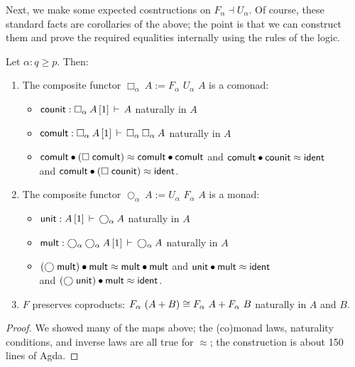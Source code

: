 \documentclass{drl-common/llncs}
\newcommand{\la}{\ensuremath{\dashv}}
\newcommand\F[2]{\ensuremath{F_{#1} \,\, #2}}
\newcommand\U[2]{\ensuremath{U_{#1} \,\, #2}}
\newcommand\coprd[2]{\ensuremath{#1 + #2}}
\newcommand\seq[3]{\ensuremath{#1 \, [ #2 ] \, \vdash \, #3}}
\newcommand\ident[1]{\ensuremath{\dsd{ident}_{#1}}}
\newcommand\cuti{\ensuremath{\bullet}}
\newcommand\ap[2]{\ensuremath{#1 \approx #2}}
\newcommand\Bx[2]{\ensuremath{\Box_{#1} \: {#2}}}
\newcommand\Crc[2]{\ensuremath{\bigcirc_{#1} \: {#2}}}
\begin{document}
Next, we make some expected cosntructions on $F_\alpha \la U_\alpha$.
Of course, these standard facts are corollaries of the above; the point
is that we can construct them and prove the required equalities
internally using the rules of the logic.

\begin{lemma}
Let $\alpha : q \ge p$.  Then:
\begin{enumerate}
\item The composite functor $\Bx{\alpha}{A} := \F{\alpha}{\U{\alpha}{A}}$ is a comonad:
\begin{itemize}
\item[] $\dsd{counit} : \seq{\Bx \alpha A}{1}{A}$ naturally in $A$
\item[] $\dsd{comult} : \seq{\Bx \alpha A}{1}{\Bx \alpha {\Bx \alpha A}}$
  naturally in $A$
\item[] 
 \ap{\dsd{comult} \cuti (\Bx{}{\dsd{comult}})}{\dsd{comult} \cuti
   \dsd{comult}}
and \ap{\dsd{comult} \cuti \dsd{counit}}{\ident{}} \\
and \ap{\dsd{comult} \cuti (\Bx{}{\dsd{counit}})}{\ident{}}.  
\end{itemize}

\item The composite functor $\Crc{\alpha}{A} := \U{\alpha}{\F{\alpha}{A}}$ is a monad:
\begin{itemize}
\item[] $\dsd{unit} : \seq{A}{1}{\Crc \alpha A}$ naturally in $A$
\item[] $\dsd{mult} : \seq{\Crc \alpha {\Crc \alpha A}}{1}{\Crc \alpha A}$
  naturally in $A$
\item[] 
 \ap{(\Crc{}{\dsd{mult}}) \cuti \dsd{mult} }{\dsd{mult} \cuti
   \dsd{mult}}
and \ap{\dsd{unit} \cuti \dsd{mult}}{\ident{}} \\
and \ap{(\Crc{}{\dsd{unit}}) \cuti \dsd{mult}}{\ident{}}.  
\end{itemize}

\item $F$ preserves coproducts: $\F \alpha (\coprd A B) \iso \coprd {\F
  \alpha A} {\F \alpha B}$ naturally in $A$ and $B$.
\end{enumerate}
\end{lemma}

\begin{proof}
We showed many of the maps above; the (co)monad laws, naturality
conditions, and inverse laws are all true for \ap{}{}; the construction
is about 150 lines of Agda.
\end{proof}
\end{document}
